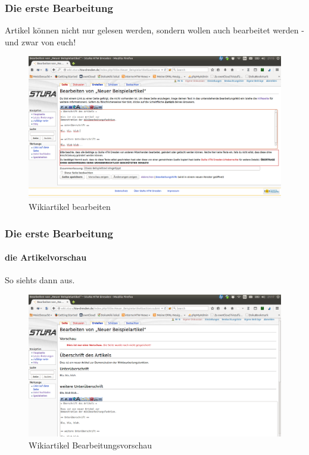 \documentclass[handout]{beamer}   %
\begin{document}
\begin{frame}
  \frametitle{Die erste Bearbeitung}
  Artikel können nicht nur gelesen werden, sondern wollen auch bearbeitet
  werden - und zwar von euch!\\

	\begin{figure}[tbph]
	\centering
	\includegraphics[width=1\linewidth]{Wikiartikel_bearbeiten}
	\caption[Wikiartikel bearbeiten]{Wikiartikel bearbeiten}
	\label{fig:Wikiartikel_bearbeiten}
	\end{figure}
\end{frame}


\begin{frame}
  \frametitle{Die erste Bearbeitung}
  \framesubtitle{die Artikelvorschau}
  So siehts dann aus.\\

	\begin{figure}[tbph]
	\centering
	\includegraphics[width=1\linewidth]{Wikiartikel_Bearbeitungsvorschau}
	\caption[Wikiartikel bearbeiten]{Wikiartikel Bearbeitungsvorschau}
	\label{fig:Wikiartikel_Bearbeitungsvorschau}
	\end{figure}
\end{frame}
\end{document}
